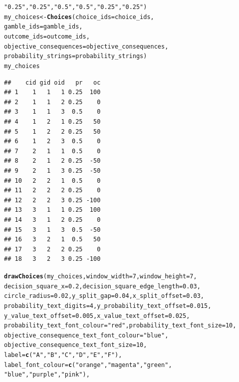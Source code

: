 \documentclass{article}\usepackage[]{graphicx}\usepackage[]{color}
\makeatletter
\newcommand{\hlnum}[1]{\textcolor[rgb]{0.686,0.059,0.569}{#1}}%
\newcommand{\hlstr}[1]{\textcolor[rgb]{0.192,0.494,0.8}{#1}}%
\newcommand{\hlstd}[1]{\textcolor[rgb]{0.345,0.345,0.345}{#1}}%
\newcommand{\hlkwb}[1]{\textcolor[rgb]{0.69,0.353,0.396}{#1}}%
\newcommand{\hlkwc}[1]{\textcolor[rgb]{0.333,0.667,0.333}{#1}}%
\newcommand{\hlkwd}[1]{\textcolor[rgb]{0.737,0.353,0.396}{\textbf{#1}}}%
\newenvironment{kframe}{%
 \def\at@end@of@kframe{}%
 \ifinner\ifhmode%
  \def\at@end@of@kframe{\end{minipage}}%
  \begin{minipage}{\columnwidth}%
 \fi\fi%
 \def\FrameCommand##1{\hskip\@totalleftmargin \hskip-\fboxsep
 \colorbox{shadecolor}{##1}\hskip-\fboxsep
     \hskip-\linewidth \hskip-\@totalleftmargin \hskip\columnwidth}%
 \MakeFramed {\advance\hsize-\width
   \@totalleftmargin\z@ \linewidth\hsize
   \@setminipage}}%
 {\par\unskip\endMakeFramed%
 \at@end@of@kframe}
\newenvironment{knitrout}{}{} %
\makeatother
\begin{document}
\begin{knitrout}
\begin{kframe}
\begin{alltt}
        \hlstr{"0.25"}\hlstd{,} \hlstr{"0.25"}\hlstd{,} \hlstr{"0.5"}\hlstd{,} \hlstr{"0.5"}\hlstd{,} \hlstr{"0.25"}\hlstd{,} \hlstr{"0.25"}\hlstd{)}
\hlstd{my_choices} \hlkwb{<-} \hlkwd{Choices}\hlstd{(}\hlkwc{choice_ids}\hlstd{=choice_ids,}
        \hlkwc{gamble_ids}\hlstd{=gamble_ids,}
        \hlkwc{outcome_ids}\hlstd{=outcome_ids,}
        \hlkwc{objective_consequences}\hlstd{=objective_consequences,}
        \hlkwc{probability_strings}\hlstd{=probability_strings)}
\hlstd{my_choices}
\end{alltt}
\begin{verbatim}
##    cid gid oid   pr   oc
## 1    1   1   1 0.25  100
## 2    1   1   2 0.25    0
## 3    1   1   3  0.5    0
## 4    1   2   1 0.25   50
## 5    1   2   2 0.25   50
## 6    1   2   3  0.5    0
## 7    2   1   1  0.5    0
## 8    2   1   2 0.25  -50
## 9    2   1   3 0.25  -50
## 10   2   2   1  0.5    0
## 11   2   2   2 0.25    0
## 12   2   2   3 0.25 -100
## 13   3   1   1 0.25  100
## 14   3   1   2 0.25    0
## 15   3   1   3  0.5  -50
## 16   3   2   1  0.5   50
## 17   3   2   2 0.25    0
## 18   3   2   3 0.25 -100
\end{verbatim}
\begin{alltt}
\hlkwd{drawChoices}\hlstd{(my_choices,} \hlkwc{window_width}\hlstd{=}\hlnum{7}\hlstd{,} \hlkwc{window_height}\hlstd{=}\hlnum{7}\hlstd{,}
        \hlkwc{decision_square_x}\hlstd{=}\hlnum{0.2}\hlstd{,} \hlkwc{decision_square_edge_length}\hlstd{=}\hlnum{0.03}\hlstd{,}
        \hlkwc{circle_radius}\hlstd{=}\hlnum{0.02}\hlstd{,} \hlkwc{y_split_gap}\hlstd{=}\hlnum{0.04}\hlstd{,} \hlkwc{x_split_offset}\hlstd{=}\hlnum{0.03}\hlstd{,}
        \hlkwc{probability_text_digits}\hlstd{=}\hlnum{4}\hlstd{,} \hlkwc{y_probability_text_offset}\hlstd{=}\hlnum{0.015}\hlstd{,}
        \hlkwc{y_value_text_offset}\hlstd{=}\hlnum{0.005}\hlstd{,} \hlkwc{x_value_text_offset}\hlstd{=}\hlnum{0.025}\hlstd{,}
        \hlkwc{probability_text_font_colour}\hlstd{=}\hlstr{"red"}\hlstd{,} \hlkwc{probability_text_font_size}\hlstd{=}\hlnum{10}\hlstd{,}
        \hlkwc{objective_consequence_text_font_colour}\hlstd{=}\hlstr{"blue"}\hlstd{,}
        \hlkwc{objective_consequence_text_font_size}\hlstd{=}\hlnum{10}\hlstd{,}
        \hlkwc{label}\hlstd{=}\hlkwd{c}\hlstd{(}\hlstr{"A"}\hlstd{,}\hlstr{"B"}\hlstd{,}\hlstr{"C"}\hlstd{,} \hlstr{"D"}\hlstd{,}\hlstr{"E"}\hlstd{,}\hlstr{"F"}\hlstd{),}
        \hlkwc{label_font_colour}\hlstd{=}\hlkwd{c}\hlstd{(}\hlstr{"orange"}\hlstd{,}\hlstr{"magenta"}\hlstd{,}\hlstr{"green"}\hlstd{,}
                \hlstr{"blue"}\hlstd{,}\hlstr{"purple"}\hlstd{,}\hlstr{"pink"}\hlstd{),}

\end{alltt}
\end{kframe}
\end{knitrout}
\end{document}
